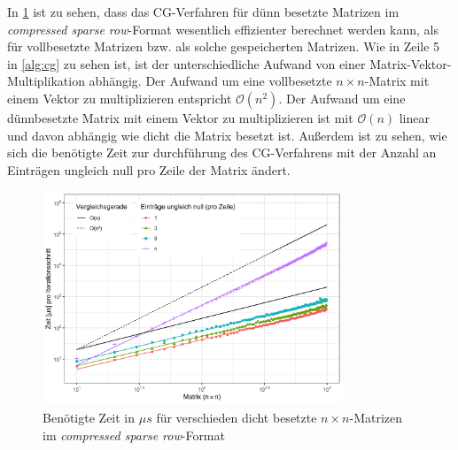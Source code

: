 \documentclass[12pt,a4paper]{scrartcl}
\numberwithin{equation}{section}
\numberwithin{myalgctr}{section}
\numberwithin{mytheoremctr}{subsection}
\numberwithin{mykorollarctr}{subsection}
\numberwithin{mylemmactr}{subsection}
\numberwithin{mybeispielctr}{subsection}
\begin{document}
	 
	
	

	In \cref{fig:zeitcg-sparse} ist zu sehen, dass das CG-Verfahren f\"ur d\"unn besetzte Matrizen im \textit{compressed sparse row}-Format wesentlich effizienter berechnet werden kann, als f\"ur vollbesetzte Matrizen bzw. als solche gespeicherten Matrizen.
	Wie in Zeile 5 in \cref{alg:cg} zu sehen ist, ist der unterschiedliche Aufwand von einer Matrix-Vektor-Multiplikation abh\"angig. Der Aufwand um eine vollbesetzte $n\times n$-Matrix mit einem Vektor zu multiplizieren entspricht $\mathcal{O}(n^2)$. Der Aufwand um eine d\"unnbesetzte Matrix mit einem Vektor zu multiplizieren ist mit $\mathcal{O}(n)$ linear und davon abh\"angig wie dicht die Matrix besetzt ist. Außerdem ist zu sehen, wie sich die ben\"otigte Zeit zur durchf\"uhrung des CG-Verfahrens mit der Anzahl an Eintr\"agen ungleich null pro Zeile der Matrix \"andert.
	
	\begin{figure}[H]
		\begin{center}
			\includegraphics[width=0.8\textwidth]{../plots/cg-sparsity-sparse.png}
		\end{center}
		\caption{Ben\"otigte Zeit in $\mu s$ f\"ur verschieden dicht besetzte $n\times n$-Matrizen im \textit{compressed sparse row}-Format}
		\label{fig:zeitcg-sparse}	
	\end{figure}
	
\end{document}
